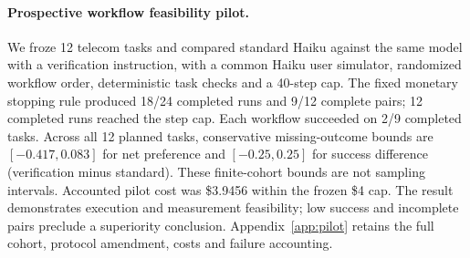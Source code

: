 \paragraph{Prospective workflow feasibility pilot.}
We froze 12 telecom tasks and compared standard Haiku against the same
model with a verification instruction, with a common Haiku user simulator,
randomized workflow order, deterministic task checks and a 40-step cap.
The fixed monetary stopping rule produced 18/24 completed runs and 9/12
complete pairs; 12 completed runs reached the step cap. Each workflow
succeeded on 2/9 completed tasks. Across all 12 planned tasks, conservative
missing-outcome bounds are $[-0.417,0.083]$ for net preference and
$[-0.25,0.25]$ for success difference (verification minus standard).
These finite-cohort bounds are not sampling intervals. Accounted pilot
cost was \$3.9456 within the frozen \$4 cap. The result demonstrates
execution and measurement feasibility; low success and incomplete pairs
preclude a superiority conclusion. Appendix~\ref{app:pilot} retains the
full cohort, protocol amendment, costs and failure accounting.
